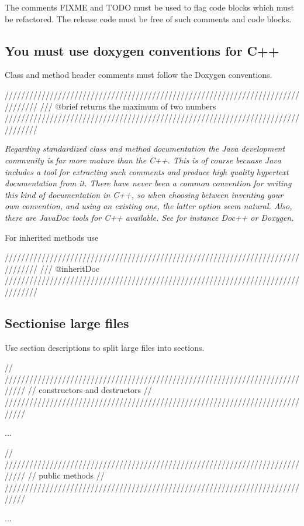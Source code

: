\documentclass[a4paper,11pt,oneside]{scrbook}
\newcommand{\guideline}[1]{{\subsection{#1}}}
\newcommand{\motivation}[1]{{\normalfont \itshape #1}}
\newcommand{\trcode}[1]{{\normalfont \ttfamily #1}}
\begin{document}
The comments \trcode{FIXME} and \trcode{TODO} must be used to flag code blocks
which must be refactored. The release code must be free of such comments and
code blocks.

\guideline{You must use doxygen conventions for C++}

Class and method header comments must follow the Doxygen conventions.
 
\begin{code}
  ////////////////////////////////////////////////////////////////////////////////
  /// @brief returns the maximum of two numbers
  ////////////////////////////////////////////////////////////////////////////////
\end{code}

\motivation{
  Regarding standardized class and method documentation the Java development
  community is far more mature than the C++. This is of course becuase Java
  includes a tool for extracting such comments and produce high quality
  hypertext documentation from it.  There have never been a common convention
  for writing this kind of documentation in C++, so when choosing between
  inventing your own convention, and using an existing one, the latter option
  seem natural. Also, there are JavaDoc tools for C++ available. See for
  instance Doc++ or Doxygen.
}

For inherited methods use

\begin{code}
  ////////////////////////////////////////////////////////////////////////////////
  /// {@inheritDoc}
  ////////////////////////////////////////////////////////////////////////////////
\end{code}

\guideline{Sectionise large files}

Use section descriptions to split large files into sections.

\begin{code}
  // /////////////////////////////////////////////////////////////////////////////
  // constructors and destructors
  // /////////////////////////////////////////////////////////////////////////////

  ...

  // /////////////////////////////////////////////////////////////////////////////
  // public methods
  // /////////////////////////////////////////////////////////////////////////////

  ...
\end{code}
 
\end{document}
